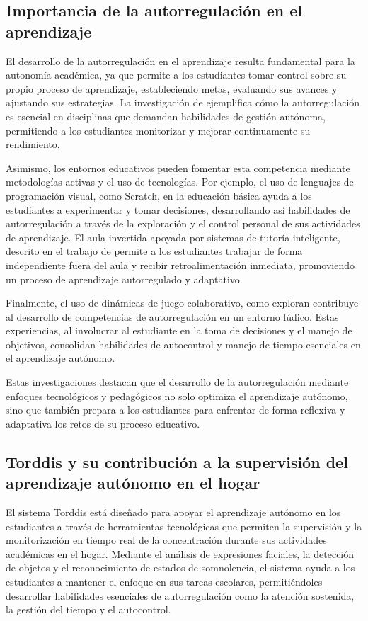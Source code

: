 \documentclass[a4paper,fleqn]{cas-sc}
\begin{document}
	\subsection{Importancia de la autorregulación en el aprendizaje}
	El desarrollo de la autorregulación en el aprendizaje resulta fundamental para la autonomía académica, ya que permite a los estudiantes tomar control sobre su propio proceso de aprendizaje, estableciendo metas, evaluando sus avances y ajustando sus estrategias. La investigación de \cite{Taber2024Developing} ejemplifica cómo la autorregulación es esencial en disciplinas que demandan habilidades de gestión autónoma, permitiendo a los estudiantes monitorizar y mejorar continuamente su rendimiento.
	
	Asimismo, los entornos educativos pueden fomentar esta competencia mediante metodologías activas y el uso de tecnologías. Por ejemplo, el uso de lenguajes de programación visual, como Scratch, en la educación básica ayuda a los estudiantes a experimentar y tomar decisiones, desarrollando así habilidades de autorregulación a través de la exploración y el control personal de sus actividades de aprendizaje. El aula invertida apoyada por sistemas de tutoría inteligente, descrito en el trabajo de \cite{Mohamed2018Implementing} permite a los estudiantes trabajar de forma independiente fuera del aula y recibir retroalimentación inmediata, promoviendo un proceso de aprendizaje autorregulado y adaptativo.
	
	Finalmente, el uso de dinámicas de juego colaborativo, como  exploran \cite{Echeverria2011AFramework} contribuye al desarrollo de competencias de autorregulación en un entorno lúdico. Estas experiencias, al involucrar al estudiante en la toma de decisiones y el manejo de objetivos, consolidan habilidades de autocontrol y manejo de tiempo esenciales en el aprendizaje autónomo.
	
	Estas investigaciones destacan que el desarrollo de la autorregulación mediante enfoques tecnológicos y pedagógicos no solo optimiza el aprendizaje autónomo, sino que también prepara a los estudiantes para enfrentar de forma reflexiva y adaptativa los retos de su proceso educativo.
	
	\subsection{Torddis y su contribución a la supervisión del aprendizaje autónomo en el hogar}
	
	El sistema Torddis está diseñado para apoyar el aprendizaje autónomo en los estudiantes a través de herramientas tecnológicas que permiten la supervisión y la monitorización en tiempo real de la concentración durante sus actividades académicas en el hogar. Mediante el análisis de expresiones faciales, la detección de objetos y el reconocimiento de estados de somnolencia, el sistema ayuda a los estudiantes a mantener el enfoque en sus tareas escolares, permitiéndoles desarrollar habilidades esenciales de autorregulación como la atención sostenida, la gestión del tiempo y el autocontrol.
	
\end{document}
